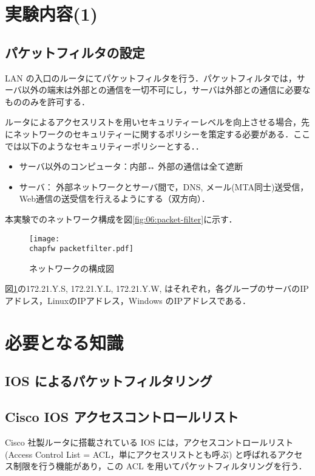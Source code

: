 \clearpage

\section{実験内容(1)}

\subsection*{パケットフィルタの設定}

LAN の入口のルータにてパケットフィルタを行う．パケットフィルタでは，サーバ以外の端末は外部との通信を一切不可にし，サーバは外部との通信に必要なもののみを許可する．

ルータによるアクセスリストを用いセキュリティーレベルを向上させる場合，先にネットワークのセキュリティーに関するポリシーを策定する必要がある．ここでは以下のようなセキュリティーポリシーとする．．

\begin{itemize}
 \item サーバ以外のコンピュータ：内部↔ 外部の通信は全て遮断
 \item サーバ： 外部ネットワークとサーバ間で，DNS, メール(MTA同士)送受信，Web通信の送受信を行えるようにする（双方向）．
\end{itemize}
本実験でのネットワーク構成を図\ref{fig:06:packet-filter}に示す．
\begin{figure}
  \centering
  \texttt{[image: \\chapfw packetfilter.pdf]}
  \caption{ネットワークの構成図}
  \label{fig:06:packet-filter1}
\end{figure}
図\ref{fig:06:packet-filter1}の172.21.Y.S, 172.21.Y.L, 172.21.Y.W, はそれぞれ，各グループのサーバのIPアドレス，LinuxのIPアドレス，Windows のIPアドレスである．

\section{必要となる知識}

\subsection{IOS によるパケットフィルタリング}

\subsection*{Cisco IOS アクセスコントロールリスト}
Cisco 社製ルータに搭載されている IOS には，アクセスコントロールリスト
(Access Control List = ACL，単にアクセスリストとも呼ぶ) と呼ばれるアクセ
ス制限を行う機能があり，この ACL を用いてパケットフィルタリングを行う．

